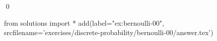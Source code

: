 
\begin{ex} 
  \label{ex:bernoulli-00}
  
  \qed
\end{ex} 
\begin{python0}
from solutions import *
add(label="ex:bernoulli-00",
    srcfilename='exercises/discrete-probability/bernoulli-00/answer.tex') 
\end{python0}

